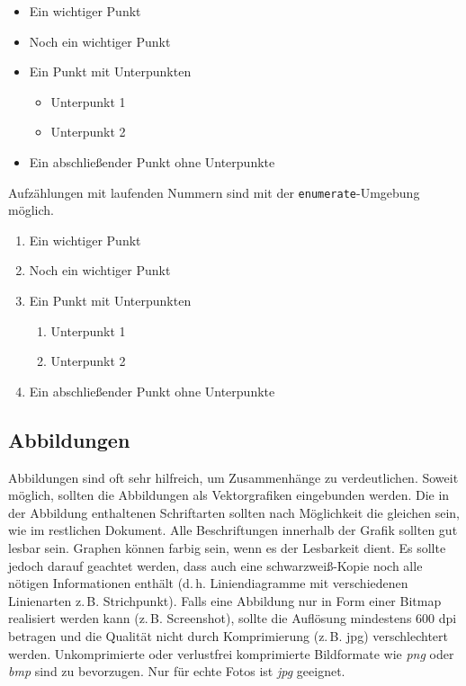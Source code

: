 \documentclass[conference,compsoc,final,a4paper]{IEEEtran}
\begin{document}
    \begin{itemize}
        \item Ein wichtiger Punkt
        \item Noch ein wichtiger Punkt
        \item Ein Punkt mit Unterpunkten
        \begin{itemize}
            \item Unterpunkt 1
            \item Unterpunkt 2
        \end{itemize}
        \item Ein abschließender Punkt ohne Unterpunkte
    \end{itemize}

    Aufzählungen mit laufenden Nummern sind mit der \texttt{enumerate}-Umgebung möglich.

    \begin{enumerate}
        \item Ein wichtiger Punkt
        \item Noch ein wichtiger Punkt
        \item Ein Punkt mit Unterpunkten
        \begin{enumerate}
            \item Unterpunkt 1
            \item Unterpunkt 2
        \end{enumerate}
        \item Ein abschließender Punkt ohne Unterpunkte
    \end{enumerate}

    \subsection{Abbildungen}
    Abbildungen sind oft sehr hilfreich, um Zusammenhänge zu verdeutlichen. Soweit möglich, sollten die Abbildungen als Vektorgrafiken eingebunden werden. Die in der Abbildung enthaltenen Schriftarten sollten nach Möglichkeit die gleichen sein, wie im restlichen Dokument. Alle Beschriftungen innerhalb der Grafik sollten gut lesbar sein.
    Graphen können farbig sein, wenn es der Lesbarkeit dient. Es sollte jedoch darauf geachtet werden, dass auch eine schwarz\-weiß-Kopie noch alle nötigen Informationen enthält (d.\,h. Liniendiagramme mit verschiedenen Linienarten z.\,B. Strichpunkt).
    Falls eine Abbildung nur in Form einer Bitmap realisiert werden kann (z.\,B. Screenshot), sollte die Auflösung mindestens 600 dpi betragen und die Qualität nicht durch Komprimierung (z.\,B. jpg) verschlechtert werden. Unkomprimierte oder verlustfrei komprimierte Bildformate wie \emph{png} oder \emph{bmp} sind zu bevorzugen. Nur für echte Fotos ist \emph{jpg} geeignet.
\end{document}

